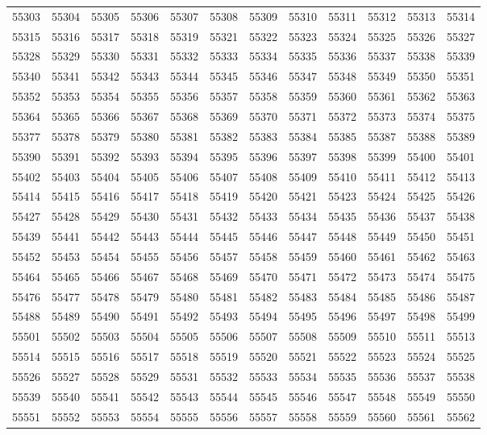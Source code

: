 \begin{center}
\begin{longtable}{llllllllllll}
55303 &55304 &55305 &55306 &55307 &55308 &55309 &55310 &55311 &55312 &55313 &55314 \\
55315 &55316 &55317 &55318 &55319 &55321 &55322 &55323 &55324 &55325 &55326 &55327 \\
55328 &55329 &55330 &55331 &55332 &55333 &55334 &55335 &55336 &55337 &55338 &55339 \\
55340 &55341 &55342 &55343 &55344 &55345 &55346 &55347 &55348 &55349 &55350 &55351 \\
55352 &55353 &55354 &55355 &55356 &55357 &55358 &55359 &55360 &55361 &55362 &55363 \\
55364 &55365 &55366 &55367 &55368 &55369 &55370 &55371 &55372 &55373 &55374 &55375 \\
55377 &55378 &55379 &55380 &55381 &55382 &55383 &55384 &55385 &55387 &55388 &55389 \\
55390 &55391 &55392 &55393 &55394 &55395 &55396 &55397 &55398 &55399 &55400 &55401 \\
55402 &55403 &55404 &55405 &55406 &55407 &55408 &55409 &55410 &55411 &55412 &55413 \\
55414 &55415 &55416 &55417 &55418 &55419 &55420 &55421 &55423 &55424 &55425 &55426 \\
55427 &55428 &55429 &55430 &55431 &55432 &55433 &55434 &55435 &55436 &55437 &55438 \\
55439 &55441 &55442 &55443 &55444 &55445 &55446 &55447 &55448 &55449 &55450 &55451 \\
55452 &55453 &55454 &55455 &55456 &55457 &55458 &55459 &55460 &55461 &55462 &55463 \\
55464 &55465 &55466 &55467 &55468 &55469 &55470 &55471 &55472 &55473 &55474 &55475 \\
55476 &55477 &55478 &55479 &55480 &55481 &55482 &55483 &55484 &55485 &55486 &55487 \\
55488 &55489 &55490 &55491 &55492 &55493 &55494 &55495 &55496 &55497 &55498 &55499 \\
55501 &55502 &55503 &55504 &55505 &55506 &55507 &55508 &55509 &55510 &55511 &55513 \\
55514 &55515 &55516 &55517 &55518 &55519 &55520 &55521 &55522 &55523 &55524 &55525 \\
55526 &55527 &55528 &55529 &55531 &55532 &55533 &55534 &55535 &55536 &55537 &55538 \\
55539 &55540 &55541 &55542 &55543 &55544 &55545 &55546 &55547 &55548 &55549 &55550 \\
55551 &55552 &55553 &55554 &55555 &55556 &55557 &55558 &55559 &55560 &55561 &55562 \\

\end{longtable}
\end{center}
